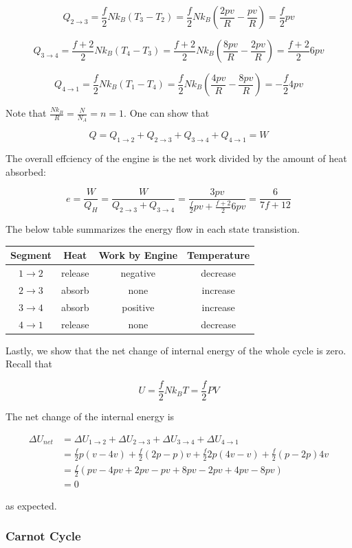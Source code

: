 \[Q_{2\to3}=\frac{f}{2} Nk_B(T_3-T_2)=\frac{f}{2} Nk_B\left(\frac{2pv}{R}-\frac{pv}{R}\right)=\frac{f}{2} pv\]

\[Q_{3\to4}=\frac{f+2}{2} Nk_B(T_4-T_3)=\frac{f+2}{2} Nk_B\left(\frac{8pv}{R}-\frac{2pv}{R}\right)=\frac{f+2}{2} 6pv\]

\[Q_{4\to1}=\frac{f}{2} Nk_B(T_1-T_4)=\frac{f}{2} Nk_B\left(\frac{4pv}{R}-\frac{8pv}{R}\right)=-\frac{f}{2} 4pv\]

Note that $\frac{Nk_B}{R}=\frac{N}{N_A}=n=1$. One can show that

\[Q=Q_{1\to2}+Q_{2\to3}+Q_{3\to4}+Q_{4\to1}=W\]

The overall effciency of the engine is the net work divided by the amount of heat absorbed:

\[e=\frac{W}{Q_H}=\frac{W}{Q_{2\to3}+Q_{3\to4}}=\frac{3pv}{\frac{f}{2} pv+\frac{f+2}{2} 6pv}=\frac{6}{7f+12}\]

The below table summarizes the energy flow in each state transistion.

\begin{center}
	\begin{tabular}{c|c|c|c}
		Segment & Heat & Work \textbf{by} Engine & Temperature \\
		\hline
		$1\to2$ & release & negative & decrease \\
		\hline
		$2\to3$ & absorb & none & increase \\
		\hline
		$3\to4$ & absorb & positive & increase \\
		\hline
		$4\to1$ & release & none & decrease
	\end{tabular}
\end{center}

Lastly, we show that the net change of internal energy of the whole cycle is zero. Recall that

\[U=\frac{f}{2}Nk_BT=\frac{f}{2}PV\]

The net change of the internal energy is

\begin{align*}
	\Delta U_{net} &= \Delta U_{1\to2}+\Delta U_{2\to3}+\Delta U_{3\to4}+\Delta U_{4\to1} \\
	&= \frac{f}{2}p(v-4v)+\frac{f}{2}(2p-p)v+\frac{f}{2}2p(4v-v)+\frac{f}{2}(p-2p)4v \\
	&=\frac{f}{2}(pv-4pv+2pv-pv+8pv-2pv+4pv-8pv) \\
	&=0
\end{align*}

as expected.

\subsubsection{Carnot Cycle}

